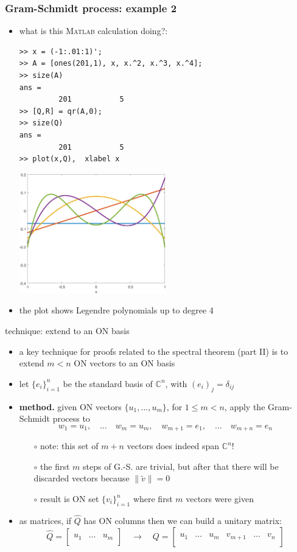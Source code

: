 \documentclass[10pt,hyperref]{beamer}
\newcommand{\CC}{\mathbb{C}}
\newcommand{\Matlab}{\textsc{Matlab}\xspace}
\newcommand{\trefmatrixtwo}[2]{\left[\begin{array}{c|c|c} & & \\ #1 & \dots & #2 \\ & & \end{array}\right]}
\newcommand{\trefmatrixgroups}[4]{\left[\begin{array}{c|c|c|c|c|c} & & & & & \\ #1 & \dots & #2 & #3 & \dots & #4 \\ & & & & & \end{array}\right]}
\begin{document}
\begin{frame}[fragile]
\frametitle{Gram-Schmidt process: example 2}

\begin{itemize}
\item what is this \Matlab calculation doing?:

\medskip
\begin{Verbatim}[fontsize=\scriptsize]
>> x = (-1:.01:1)';
>> A = [ones(201,1), x, x.^2, x.^3, x.^4];
>> size(A)
ans =
         201           5
>> [Q,R] = qr(A,0);
>> size(Q)
ans =
         201           5
>> plot(x,Q),  xlabel x
\end{Verbatim}

\vspace{-15mm}
\hfill \includegraphics[width=0.5\textwidth]{figs/legendre} \quad 

\item the plot shows Legendre polynomials up to degree 4
\end{itemize}
\end{frame}


\begin{frame}{technique: extend to an ON basis}

\begin{itemize}
\item a key technique for proofs related to the spectral theorem (part II) is to extend $m<n$ ON vectors to an ON basis
\item let $\{e_i\}_{i=1}^n$ be the standard basis of $\CC^n$, with $(e_i)_j = \delta_{ij}$
\item \textbf{method.} given ON vectors $\{u_1,\dots,u_m\}$, for $1 \le m<n$, apply the Gram-Schmidt process to
    $$w_1=u_1, \quad \dots \quad w_m=u_m, \quad w_{m+1}=e_1, \quad \dots \quad w_{m+n}=e_n$$

\vspace{-2mm}
    \begin{itemize}
    \item[$\circ$] note: this set of $m+n$ vectors does indeed span $\CC^n$!
    \item[$\circ$] the first $m$ steps of G.-S. are trivial, but after that there will be discarded vectors because $\|\tilde v\|=0$
    \item[$\circ$] result is ON set $\{v_i\}_{i=1}^n$ where first $m$ vectors were given
    \end{itemize}
\item as matrices, if $\hat Q$ has ON columns then we can build a unitary matrix:
\small
    $$\hat Q = \trefmatrixtwo{u_1}{u_m} \quad \to \quad Q = \trefmatrixgroups{u_1}{u_m}{v_{m+1}}{v_n}$$
\end{itemize}
\end{frame}
\end{document}
